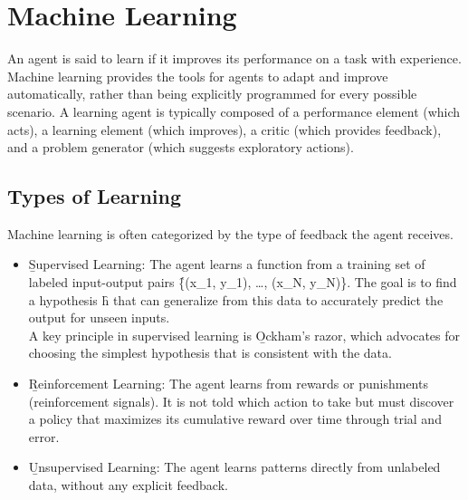 \section{Machine Learning}
An agent is said to learn if it improves its performance on a task with experience. Machine learning provides the tools for agents to adapt and improve automatically, rather than being explicitly programmed for every possible scenario. A learning agent is typically composed of a performance element (which acts), a learning element (which improves), a critic (which provides feedback), and a problem generator (which suggests exploratory actions).

\subsection{Types of Learning}
Machine learning is often categorized by the type of feedback the agent receives.
\begin{itemize}
    \item \b{Supervised Learning:} The agent learns a function from a training set of labeled input-output pairs \f{\{(x_1, y_1), \dots, (x_N, y_N)\}}. The goal is to find a hypothesis \f{h} that can generalize from this data to accurately predict the output for unseen inputs. \\
    A key principle in supervised learning is \b{Ockham's razor}, which advocates for choosing the simplest hypothesis that is consistent with the data.
    \item \b{Reinforcement Learning:} The agent learns from rewards or punishments (reinforcement signals). It is not told which action to take but must discover a policy that maximizes its cumulative reward over time through trial and error.
    \item \b{Unsupervised Learning:} The agent learns patterns directly from unlabeled data, without any explicit feedback.
\end{itemize}


